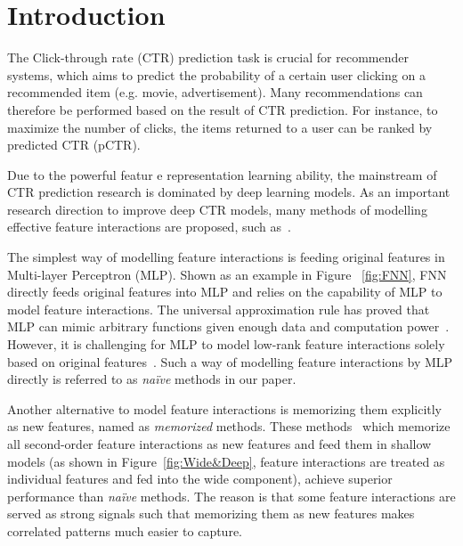 \documentclass[conference]{IEEEtran}
\begin{document}
\section{Introduction}
\label{sec:intro}










The Click-through rate (CTR) prediction task is crucial for recommender systems, which aims to predict the probability of a certain user clicking on a recommended item (e.g. movie, advertisement)\cite{Wide_Deep,DeepFM,PNN16,PNN19}. Many recommendations can therefore be performed based on the result of CTR prediction. For instance, to maximize the number of clicks, the items returned to a user can be ranked by predicted CTR (pCTR). 

Due to the powerful featur  e representation learning ability, the mainstream of CTR prediction research is dominated by deep learning models. 
As an important research direction to improve deep CTR models, many methods of modelling effective feature interactions are proposed, such as~\cite{FNN,DeepFM,Wide_Deep,PNN16,PNN19}. 

The simplest way of modelling feature interactions is feeding original features in Multi-layer Perceptron (MLP). Shown as an example in Figure ~\ref{fig:FNN}, FNN~\cite{FNN} directly feeds original features into MLP and relies on the capability of MLP to model feature interactions. The universal approximation rule has proved that MLP can mimic arbitrary functions given enough data and computation power~\cite{Universal}. However, it is challenging for MLP to model low-rank feature interactions solely based on original features~\cite{Latent-Cross}. Such a way of modelling feature interactions by MLP directly is referred to as \emph{naïve} methods in our paper.

Another alternative to model feature interactions is memorizing them explicitly as new features, named as \emph{memorized} methods. These methods~\cite{Poly-2,Wide_Deep} which memorize all second-order feature interactions as new features and feed them in shallow models (as shown in Figure~\ref{fig:Wide&Deep}, feature interactions are treated as individual features and fed into the wide component), achieve superior performance than \emph{naïve} methods. The reason is that some feature interactions are served as strong signals such that memorizing them as new features makes correlated patterns much easier to capture. 
\end{document}
